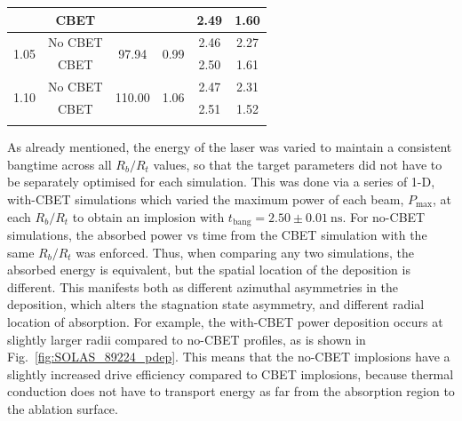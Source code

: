 \begin{table}[]
\begin{tabular}{cccccc}
                          & CBET    &                                                                                    &                                                                         & 2.49                                                                      & 1.60                                 \\ \hline
    \multirow{2}{*}{1.05} & No CBET & \multirow{2}{*}{97.94}                                                             & \multirow{2}{*}{0.99}                                                   & 2.46                                                                      & 2.27                                 \\
                          & CBET    &                                                                                    &                                                                         & 2.50                                                                      & 1.61                                 \\ \hline
    \multirow{2}{*}{1.10} & No CBET & \multirow{2}{*}{110.00}                                                            & \multirow{2}{*}{1.06}                                                   & 2.47                                                                      & 2.31                                 \\
                          & CBET    &                                                                                    &                                                                         & 2.51                                                                      & 1.52                                 \\ \hhline{======}
    \end{tabular}%
    \label{tab:res1_1d_tuning}
\end{table}
\egroup%

As already mentioned, the energy of the laser was varied to maintain a consistent bangtime across all $R_b/R_t$ values, so that the target parameters did not have to be separately optimised for each simulation.
This was done via a series of 1-D, with-\ac{CBET} simulations which varied the maximum power of each beam, $P_{\text{max}}$, at each $R_b/R_t$ to obtain an implosion with $t_{\text{bang}}=2.50 \pm 0.01\ \text{ns}$.
For no-\ac{CBET} simulations, the absorbed power vs time from the \ac{CBET} simulation with the same $R_b/R_t$ was enforced.
Thus, when comparing any two simulations, the absorbed energy is equivalent, but the spatial location of the deposition is different.
This manifests both as different azimuthal asymmetries in the deposition, which alters the stagnation state asymmetry, and different radial location of absorption.
For example, the with-\ac{CBET} power deposition occurs at slightly larger radii compared to no-\ac{CBET} profiles, as is shown in Fig.~\ref{fig:SOLAS_89224_pdep}.
This means that the no-\ac{CBET} implosions have a slightly increased drive efficiency compared to \ac{CBET} implosions, because thermal conduction does not have to transport energy as far from the absorption region to the ablation surface.

